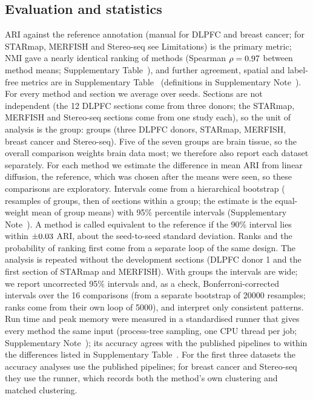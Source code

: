 \documentclass[unnumsec,webpdf,contemporary,large]{oup-authoring-template}
\begin{document}
\subsection{Evaluation and statistics}
ARI against the reference annotation (manual for DLPFC and breast cancer; for STARmap, MERFISH and Stereo-seq see Limitations) is the primary metric; NMI gave a nearly identical ranking of methods (Spearman $\rho=0.97$ between method means; Supplementary Table~\STnmi), and
further agreement, spatial and label-free metrics are in Supplementary Table~\STmetrics{} (definitions in Supplementary
Note~\SNmetrics). For every method and section we average over seeds. Sections are not independent (the 12 DLPFC sections come
from three donors; the STARmap, MERFISH and Stereo-seq sections come from one study each), so the unit of analysis is the group:
\statClusters{} groups (three DLPFC donors, STARmap, MERFISH, breast cancer and Stereo-seq). Five of the seven groups are brain
tissue, so the overall comparison weights brain data most; we therefore also report each dataset separately. For each method we estimate the difference in mean ARI from
linear diffusion, the reference, which was chosen after the means were seen, so these comparisons are exploratory. Intervals
come from a hierarchical bootstrap (\statBoot{} resamples of groups, then of sections within a group; the estimate is the
equal-weight mean of group means) with 95\% percentile intervals (Supplementary Note~\SNstats). A method is called equivalent
to the reference if the 90\% interval lies within $\pm0.03$ ARI, about the seed-to-seed standard deviation. Ranks and the
probability of ranking first come from a separate loop of the same design. The analysis is repeated without the development sections (DLPFC donor 1
and the first section of STARmap and MERFISH). With \statClusters{} groups the intervals are wide; we report
uncorrected 95\% intervals and, as a check, Bonferroni-corrected intervals over the 16 comparisons (from a separate bootstrap of 20000 resamples; ranks come from their own loop of 5000), and interpret only consistent
patterns. Run time and peak memory were measured in a standardised runner that
gives every method the same input (process-tree sampling, one CPU thread per job; Supplementary Note~\SNcompute); its accuracy
agrees with the published pipelines to within the differences listed in Supplementary Table~\STagree. For the first three datasets
the accuracy analyses use the published pipelines; for breast cancer and Stereo-seq they use the runner, which records both the
method's own clustering and matched clustering.
\end{document}

